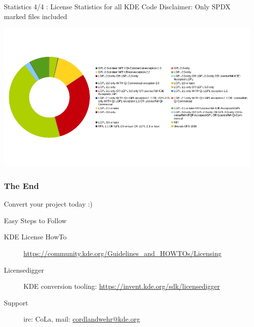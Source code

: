 \documentclass[t,compress,aspectratio=169]{beamer}
\begin{document}
\begin{frame}
    {Statistics 4/4 : License Statistics for all KDE Code}
    {Disclaimer: Only SPDX marked files included}
    
    \begin{center}
        \includegraphics[height=.7\paperheight]{license-overview}
    \end{center}
\end{frame}

\begin{frame}
    \frametitle{The End}
    \vspace{0.3cm}
    \begin{block}{}
        \centering\begin{Huge}Convert your project today :)\end{Huge}
    \end{block}
    \medskip

    \vspace{0.5cm}
    \begin{tiny}
        \begin{block}{Easy Steps to Follow}
            \begin{description}
                \item [KDE License HowTo] \url{https://community.kde.org/Guidelines_and_HOWTOs/Licensing}
                \item [Licensedigger] KDE conversion tooling: \url{https://invent.kde.org/sdk/licensedigger}
                \item [Support] irc: CoLa, mail: \url{cordlandwehr@kde.org}
            \end{description}
        \end{block}
    \end{tiny}
\end{frame}
\end{document}
